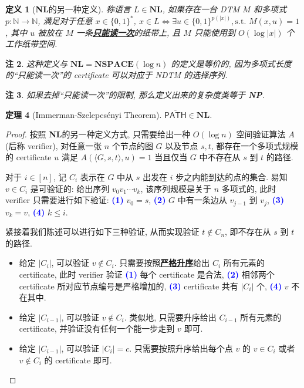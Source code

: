 \documentclass[8pt]{article}
\theoremstyle{compact}
\newtheorem{theorem}{定理}[section]
\newtheorem{definition}[theorem]{定义}
\newtheorem{remark}[theorem]{注}
\def\obj#1{\textbf{\uline{#1}}}
\def\num#1{\textnormal{\textbf{\mbox{\textcolor{blue}{(#1)}}}}}
\def\le{\leqslant}
\def\NP{\textbf{NP}}
\def\NSPACE{\textbf{NSPACE}}
\def\NL{\textbf{NL}}
\begin{document}
\begin{definition}[\NL 的另一种定义]
	称语言 $L \in \NL$, 如果存在一台 DTM $M$ 和多项式 $p: \mathbb N \to \mathbb N$, 满足对于任意 $x \in \{0, 1\}^*$, $x \in L \Leftrightarrow \exists u \in \{0, 1\}^{p(|x|)}, \text{s.t. } M(x, u) = 1$, 其中 $u$ 被放在 $M$ 一条\obj{只能读一次}的纸带上, 且 $M$ 只能使用到 $O(\log |x|)$ 个工作纸带空间.
\end{definition}
\begin{remark}
	这种定义与 $\NL = \NSPACE(\log n)$ 的定义是等价的, 因为多项式长度的“只能读一次”的 certificate 可以对应于 NDTM 的选择序列.
\end{remark}
\begin{remark}
	如果去掉“只能读一次”的限制, 那么定义出来的复杂度类等于 \NP.
\end{remark}
\begin{theorem}[Immerman-Szelepcsényi Theorem]
	$\overline{\textsf{PATH}} \in \NL$.
	\label{path_conl}
\end{theorem}
\begin{proof}
	按照 \NL 的另一种定义方式, 只需要给出一种 $O(\log n)$ 空间验证算法 $A$(后称 verifier), 对任意一张 $n$ 个节点的图 $G$ 以及节点 $s, t$, 都存在一个多项式规模的 certificate $u$ 满足 $A(\langle G, s, t \rangle, u) = 1$ 当且仅当 $G$ 中不存在从 $s$ 到 $t$ 的路径.

	对于 $i \in [n]$, 记 $C_i$ 表示在 $G$ 中从 $s$ 出发在 $i$ 步之内能到达的点的集合. 易知 $v \in C_i$ 是可验证的: 给出序列 $v_0v_1 \cdots v_k$, 该序列规模是关于 $n$ 多项式的, 此时 verifier 只需要进行如下验证: \num{1} $v_0 = s$, \num{2} $G$ 中有一条边从 $v_{j-1}$ 到 $v_j$, \num{3} $v_k = v$, \num{4} $k \le i$. 

	紧接着我们陈述可以进行如下三种验证, 从而实现验证 $t \notin C_n$, 即不存在从 $s$ 到 $t$ 的路径.
	\begin{itemize}
		\item 给定 $|C_i|$, 可以验证 $v \notin C_i$. 只需要按照\obj{严格升序}给出 $C_i$ 所有元素的 certificate, 此时 verifier 验证 \num{1} 每个 certificate 是合法, \num{2} 相邻两个 certificate 所对应节点编号是严格增加的, \num{3} certificate 共有 $|C_i|$ 个, \num{4} $v$ 不在其中.
		\item 给定 $|C_{i-1}|$, 可以验证 $v \notin C_i$. 类似地, 只需要升序给出 $C_{i-1}$ 所有元素的 certificate, 并验证没有任何一个能一步走到 $v$ 即可.
		\item 给定 $|C_{i-1}|$, 可以验证 $|C_i| = c$. 只需要按照升序给出每个点 $v$ 的 $v \in C_i$ 或者 $v \notin C_i$ 的 certificate 即可.
	\end{itemize}
\end{proof}
\end{document}
